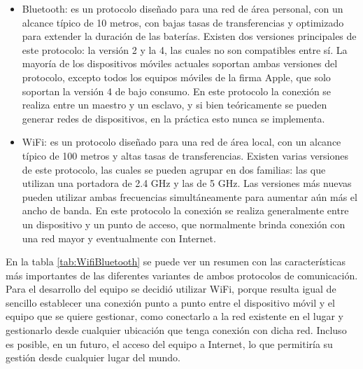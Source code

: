 \begin{itemize}
	\item Bluetooth: es un protocolo diseñado para una red de área personal, con un alcance típico de 10 metros, con bajas tasas de transferencias y optimizado para extender la duración de las baterías. Existen dos versiones principales de este protocolo: la versión 2 y la 4, las cuales no son compatibles entre sí. La mayoría de los dispositivos móviles actuales soportan ambas versiones del protocolo, excepto todos los equipos móviles de la firma Apple, que solo soportan la versión 4 de bajo consumo. En este protocolo la conexión se realiza entre un maestro y un esclavo, y si bien teóricamente se pueden generar redes de dispositivos, en la práctica esto nunca se implementa.
	
	\item WiFi: es un protocolo diseñado para una red de área local, con un alcance típico de 100 metros y altas tasas de transferencias. Existen varias versiones de este protocolo, las cuales se pueden agrupar en dos familias: las que utilizan una portadora de 2.4 GHz y las de 5 GHz. Las versiones más nuevas pueden utilizar ambas frecuencias simultáneamente para aumentar aún más el ancho de banda. En este protocolo la conexión se realiza generalmente entre un dispositivo y un punto de acceso, que normalmente brinda conexión con una red mayor y eventualmente con Internet.
\end{itemize}

En la tabla \ref{tab:WifiBluetooth} se puede ver un resumen con las características más importantes de las diferentes variantes de ambos protocolos de comunicación. Para el desarrollo del equipo se decidió utilizar WiFi, porque resulta igual de sencillo establecer una conexión punto a punto entre el dispositivo móvil y el equipo que se quiere gestionar, como conectarlo a la red existente en el lugar y gestionarlo desde cualquier ubicación que tenga conexión con dicha red. Incluso es posible, en un futuro, el acceso del equipo a Internet, lo que permitiría su gestión desde cualquier lugar del mundo.

